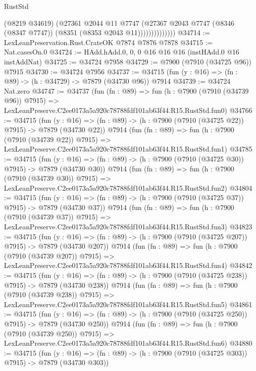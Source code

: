\begin{lexlean}{RustStd}
\begin{coremodule}
                        (@8219 @34619)
                        (@27361
                          @2044
                          @11
                          @7747
                          (@27367
                            @2043
                            @7747
                            (@8346 (@8347 @7747))
                            (@8351 (@8353 @2043 @11))))))))))))))
@34714 := LexLeanPreservation.Rust.CrateOK @7874 @7876 @7878
@34715 := Nat.casesOn.{0}
@34724 := HAdd.hAdd.{0, 0, 0} @16 @16 @16 (instHAdd.{0} @16 instAddNat)
@34725 := @34724 @7958
@34729 := @7900 (@7910 (@34725 @96)) @7915
@34730 := @34724 @7956
@34737 := @34715 (fun (y : @16) => (fn : @89) -> (h : @34729) -> @7879 (@34730 @96)) @7914
@34739 := @34724 Nat.zero
@34747 := @34737
    (fun (fn : @89) =>
    fun (h : @7900 (@7910 (@34739 @96)) @7915) =>
    LexLeanPreserve.C2ee0173a5a920c78788fdf101ab63f44.R15.RustStd.fun0)
@34766 := @34715
    (fun (y : @16) => (fn : @89) -> (h : @7900 (@7910 (@34725 @22)) @7915) -> @7879 (@34730 @22))
    @7914
    (fun (fn : @89) =>
    fun (h : @7900 (@7910 (@34739 @22)) @7915) =>
    LexLeanPreserve.C2ee0173a5a920c78788fdf101ab63f44.R15.RustStd.fun1)
@34785 := @34715
    (fun (y : @16) => (fn : @89) -> (h : @7900 (@7910 (@34725 @30)) @7915) -> @7879 (@34730 @30))
    @7914
    (fun (fn : @89) =>
    fun (h : @7900 (@7910 (@34739 @30)) @7915) =>
    LexLeanPreserve.C2ee0173a5a920c78788fdf101ab63f44.R15.RustStd.fun2)
@34804 := @34715
    (fun (y : @16) => (fn : @89) -> (h : @7900 (@7910 (@34725 @37)) @7915) -> @7879 (@34730 @37))
    @7914
    (fun (fn : @89) =>
    fun (h : @7900 (@7910 (@34739 @37)) @7915) =>
    LexLeanPreserve.C2ee0173a5a920c78788fdf101ab63f44.R15.RustStd.fun3)
@34823 := @34715
    (fun (y : @16) => (fn : @89) -> (h : @7900 (@7910 (@34725 @207)) @7915) -> @7879 (@34730 @207))
    @7914
    (fun (fn : @89) =>
    fun (h : @7900 (@7910 (@34739 @207)) @7915) =>
    LexLeanPreserve.C2ee0173a5a920c78788fdf101ab63f44.R15.RustStd.fun4)
@34842 := @34715
    (fun (y : @16) => (fn : @89) -> (h : @7900 (@7910 (@34725 @238)) @7915) -> @7879 (@34730 @238))
    @7914
    (fun (fn : @89) =>
    fun (h : @7900 (@7910 (@34739 @238)) @7915) =>
    LexLeanPreserve.C2ee0173a5a920c78788fdf101ab63f44.R15.RustStd.fun5)
@34861 := @34715
    (fun (y : @16) => (fn : @89) -> (h : @7900 (@7910 (@34725 @250)) @7915) -> @7879 (@34730 @250))
    @7914
    (fun (fn : @89) =>
    fun (h : @7900 (@7910 (@34739 @250)) @7915) =>
    LexLeanPreserve.C2ee0173a5a920c78788fdf101ab63f44.R15.RustStd.fun6)
@34880 := @34715
    (fun (y : @16) => (fn : @89) -> (h : @7900 (@7910 (@34725 @303)) @7915) -> @7879 (@34730 @303))

\end{coremodule}
\end{lexlean}
